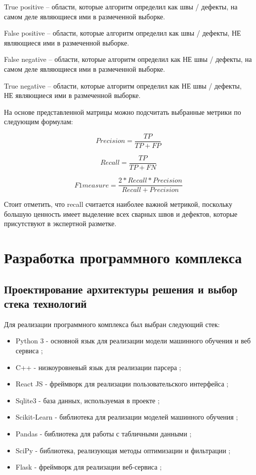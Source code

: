 \documentclass[a4paper,article,14pt]{extarticle}
\begin{document}
True positive – области, которые алгоритм определил как швы / дефекты, на самом деле являющиеся ими в размеченной выборке.

False positive – области, которые алгоритм определил как швы / дефекты, НЕ являющиеся ими в размеченной выборке.

False negative – области, которые алгоритм определил как НЕ швы / дефекты, на самом деле являющиеся ими в размеченной выборке.

True negative – области, которые алгоритм определил как НЕ швы / дефекты, НЕ являющиеся ими в размеченной выборке.

На основе представленной матрицы можно подсчитать выбранные метрики по следующим формулам:

\begin{equation}
    Precision = \frac{TP}{TP+FP}
\end{equation}

\begin{equation}
    Recall = \frac{TP}{TP+FN}
\end{equation}

\begin{equation}
    F1measure = \frac{2*Recall*Precision}{Recall+Precision}
\end{equation}

Стоит отметить, что recall считается наиболее важной метрикой, поскольку большую ценность имеет выделение всех сварных швов и дефектов, которые присутствуют в экспертной разметке. 

\pagebreak
\section{Разработка программного комплекса}

\subsection{Проектирование архитектуры решения и выбор \\стека технологий}

Для реализации программного комплекса был выбран следующий стек:
\begin{itemize}
    \item Python 3 - основной язык для реализации модели машинного обучения и веб сервиса \cite{s5};
    \item C++ - низкоуровневый язык для реализации парсера \cite{s6};
    \item React JS - фреймворк для реализации пользовательского интерфейса \cite{s7};
    \item Sqlite3 - база данных, используемая в проекте \cite{s8};
    \item Scikit-Learn - библиотека для реализации моделей машинного обучения \cite{s9};
    \item Pandas - библиотека для работы с табличными данными \cite{s10};
    \item SciPy - библиотека, реализующая методы оптимизации и фильтрации \cite{s11};
    \item Flask - фреймворк для реализации веб-сервиса \cite{s12};
\end{itemize}
\end{document}
